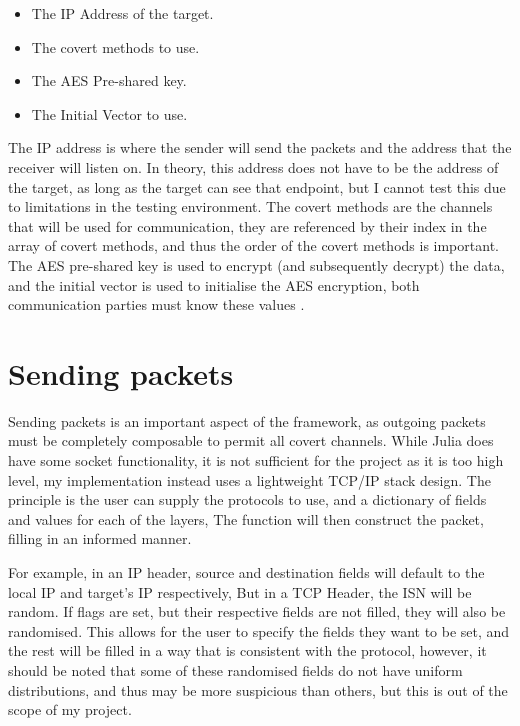 \begin{itemize}
    \item The IP Address of the target.
    \item The covert methods to use.
    \item The AES Pre-shared key.
    \item The Initial Vector to use.
\end{itemize}

The IP address is where the sender will send the packets and the address that the receiver will listen on. In theory, this address does not have to be the address of the target, as long as the target can see that endpoint, but I cannot test this due to limitations in the testing environment. The covert methods are the channels that will be used for communication, they are referenced by their index in the array of covert methods, and thus the order of the covert methods is important.
The AES pre-shared key is used to encrypt (and subsequently decrypt) the data, and the initial vector is used to initialise the AES encryption, both communication parties must know these values \citep{GUCCA}.

\section{Sending packets}
\label{sec:sending_packets}

Sending packets is an important aspect of the framework, as outgoing packets must be completely composable to permit all covert channels. While Julia does have some socket functionality, it is not sufficient for the project as it is too high level, my implementation instead uses a lightweight TCP/IP stack design. The principle is the user can supply the protocols to use, and a dictionary of fields and values for each of the layers, The function will then construct the packet, filling in an informed manner.

For example, in an IP header, source and destination fields will default to the local IP and target's IP respectively, But in a TCP Header, the ISN will be random. If flags are set, but their respective fields are not filled, they will also be randomised. This allows for the user to specify the fields they want to be set, and the rest will be filled in a way that is consistent with the protocol, however, it should be noted that some of these randomised fields do not have uniform distributions, and thus may be more suspicious than others, but this is out of the scope of my project.
 
